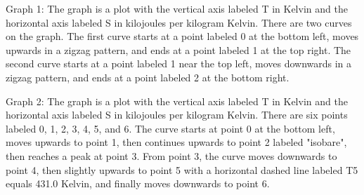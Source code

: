 Graph 1: The graph is a plot with the vertical axis labeled T in Kelvin and the horizontal axis labeled S in kilojoules per kilogram Kelvin. There are two curves on the graph. The first curve starts at a point labeled 0 at the bottom left, moves upwards in a zigzag pattern, and ends at a point labeled 1 at the top right. The second curve starts at a point labeled 1 near the top left, moves downwards in a zigzag pattern, and ends at a point labeled 2 at the bottom right.

Graph 2: The graph is a plot with the vertical axis labeled T in Kelvin and the horizontal axis labeled S in kilojoules per kilogram Kelvin. There are six points labeled 0, 1, 2, 3, 4, 5, and 6. The curve starts at point 0 at the bottom left, moves upwards to point 1, then continues upwards to point 2 labeled "isobare", then reaches a peak at point 3. From point 3, the curve moves downwards to point 4, then slightly upwards to point 5 with a horizontal dashed line labeled T5 equals 431.0 Kelvin, and finally moves downwards to point 6.